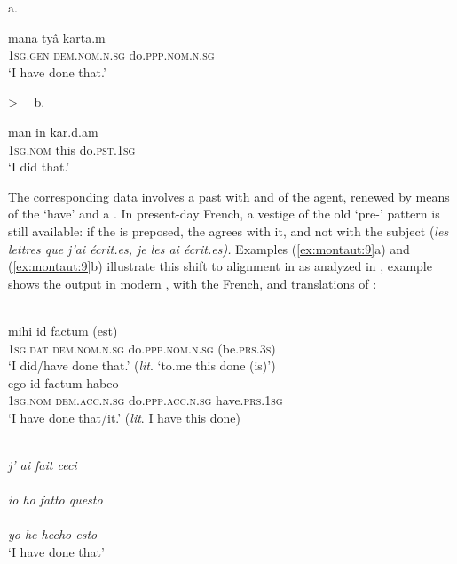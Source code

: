 \documentclass[output=paper]{langsci/langscibook}
\begin{document}
\begin{exe}\label{ex:montaut:8}
\ex 
a.
\parbox[t]{.52\textwidth}{
\gll mana  tyâ  karta.m\\
\textsc{1sg.gen}   \textsc{dem.nom.n.sg}  do.\textsc{ppp.nom.n.sg}\\
\glt ‘I have done that.’  
}
{\Large >~~}
b.
\parbox[t]{.35\textwidth}{
\gll       man in kar.d.am\\
      \textsc{1sg.nom}     this    
do.\textsc{pst.1sg}\\
\glt     ‘I did that.’
} 
\end{exe}

The corresponding  data involves a  past with  and  of the agent, renewed by means of the ‘have’  and a . In present-day French, a vestige of the old ‘pre-’ pattern is still available: if the  is preposed, the  agrees with it, and not with the subject (\textit{les lettres que j’ai écrit.es, je les ai écrit.es).} Examples (\ref{ex:montaut:9}a) and (\ref{ex:montaut:9}b) illustrate this shift to  alignment in  as analyzed in \citet{Kuryłowicz1931}, example  shows the output in modern , with the French,  and  translations of :

\ea
\label{ex:montaut:9}
\ea 
{}\\ 
\gll mihi  id   factum (est)\\
\textsc{1sg.dat}   \textsc{dem.nom.n.sg}     do.\textsc{ppp.nom.n.sg} (be.\textsc{prs.3s})\\
\glt ‘I did/have done that.’ (\textit{lit}. ‘to.me this done (is)’)
\ex 
{}\\
\gll ego  id   factum   habeo\\
\textsc{1sg.nom}   \textsc{dem.acc.n.sg}   do.\textsc{ppp.acc.n.sg} have.\textsc{prs.1sg}\\
\glt ‘I have done that/it.’ (\textit{lit}. I have this done)
\z 
\z 

\ea\label{ex:montaut:10}
\\
\textit{j’    ai       fait     ceci}       \\
\\
\textit{io   ho      fatto   questo}     \\
\\
\textit{yo   he      hecho   esto}       \\
\glt `I     have  done   that'
\z 
\end{document}
